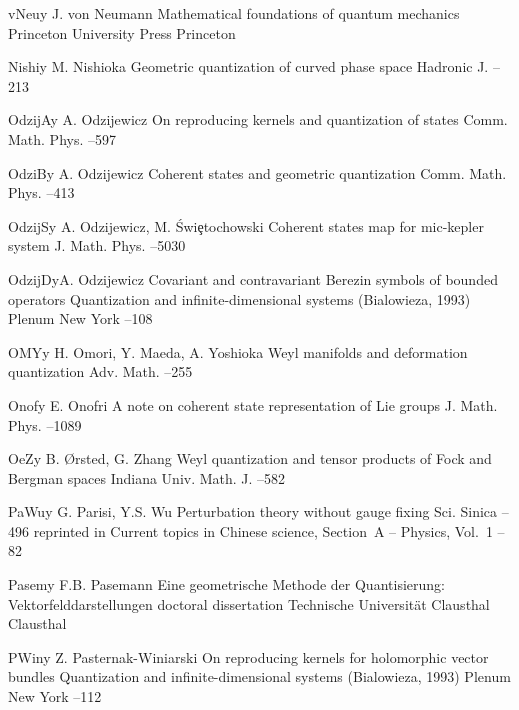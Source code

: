 \documentclass[11pt]{amsart}
\numberwithin{equation}{section}
\theoremstyle{remark}
\newcommand{\by}{\mathbf y}
\begin{document}
\begin{thebibliography}{199}
 vNeu\by{ J. von Neumann \book Mathematical foundations of quantum
mechanics \publ Princeton University Press \publaddr Princeton }

 Nishi\by{ M. Nishioka \paper Geometric quantization of curved phase
space \jour Hadronic J.   --213}

 OdzijA\by{ A. Odzijewicz \paper On reproducing kernels and quantization
of states \jour Comm. Math. Phys.   --597}

 OdziB\by{ A. Odzijewicz \paper Coherent states and geometric quantization
\jour Comm. Math. Phys.   --413}

 OdzijS\by{ A. Odzijewicz, M. \'Swi\c{e}tochowski \paper Coherent
states map for mic-kepler system \jour J. Math. Phys.  
--5030}

 OdzijD\by{A. Odzijewicz \paper Covariant and contravariant Berezin
symbols of bounded operators \inbook Quantization and infinite-dimensional
systems (Bialowieza, 1993)  \publ Plenum \publaddr New York  --108}

 OMY\by{ H. Omori, Y. Maeda, A. Yoshioka \paper Weyl manifolds and
deformation quantization \jour Adv. Math.   --255}

 Onof\by{ E. Onofri \paper A note on coherent state representation of Lie
groups \jour J. Math. Phys.   --1089}

 OeZ\by{ B. \O rsted, G. Zhang \paper Weyl quantization and tensor
products of Fock and Bergman spaces \jour Indiana Univ. Math. J. 
 --582}

 PaWu\by{ G. Parisi, Y.S. Wu \paper Perturbation theory without gauge
fixing \jour Sci. Sinica   --496 \moreref \inbook
reprinted in Current topics in Chinese science, Section~A -- Physics, Vol.~1
--82}

 Pasem\by{ F.B. Pasemann \book Eine geometrische Methode der
Quantisierung: Vektorfelddarstellungen \bookinfo doctoral dissertation \publ
Technische Universit\"at Clausthal \publaddr Clausthal }

 PWin\by{ Z. Pasternak-Winiarski \paper On reproducing kernels for
holomorphic vector bundles \inbook Quantization and infinite-dimensional
systems (Bialowieza, 1993)  \publ Plenum \publaddr New York  --112}


\end{thebibliography}
\end{document}
